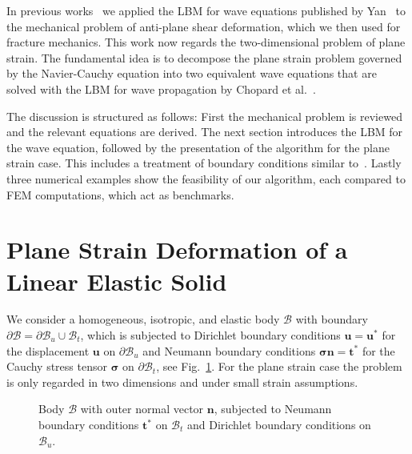 \documentclass{article}
\renewcommand{\vec}{\boldsymbol}        %
\begin{document}
In previous works~\cite{schluter_lattice_2018,schluter_boundary_2021} we applied the LBM for wave equations published by Yan~\cite{yan_lattice_2000} to the mechanical problem of anti-plane shear deformation, which we then used for fracture mechanics. This work now regards the two-dimensional problem of plane strain.
The fundamental idea is to decompose the plane strain problem governed by the Navier-Cauchy equation into two equivalent wave equations that are solved with the LBM
for wave propagation  by Chopard et al.~\cite{chopard_lattice_1998}.

The discussion is structured as follows:
First the mechanical problem is reviewed and the relevant equations are derived.
The next section introduces the LBM for the wave equation, followed by the presentation of the algorithm for the plane strain case. This includes a treatment of boundary conditions similar to~\cite{schluter_boundary_2021}.
Lastly three numerical examples show the feasibility of our algorithm, each compared to FEM computations, which act as benchmarks.



\section{Plane Strain Deformation of a Linear Elastic Solid}
\label{sec:elastic}

We consider a homogeneous, isotropic, and elastic body $\mathcal{B}$ with boundary $\partial\mathcal{B}=\partial\mathcal{B}_u\cup\mathcal{B}_t$, which is subjected to Dirichlet boundary conditions $\boldsymbol{u}=\vec{u}^*$ for the displacement $\vec{u}$  on $\partial\mathcal{B}_u$ and Neumann boundary conditions $\vec{\sigma}\vec{n}=\boldsymbol{t}^*$ for the Cauchy stress tensor $\vec{\sigma}$ on $\partial\mathcal{B}_t$, see  Fig.~\ref{fig:body}. For the plane strain case the problem is only regarded in two dimensions and under small strain assumptions.

\begin{figure}[bt]
    \centering
    
    \caption{%
        Body $\mathcal{B}$ with outer normal vector $\boldsymbol{n}$, subjected to Neumann boundary conditions $\vec{t}^*$ on $\mathcal{B}_t$ and Dirichlet boundary conditions on $\mathcal{B}_u$.
    }
    \label{fig:body}
\end{figure}
\end{document}
